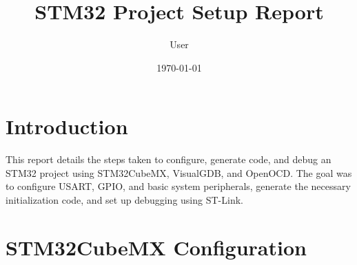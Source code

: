 \documentclass{article}
\title{STM32 Project Setup Report}
\author{User}
\date{\today}
\begin{document}
\maketitle

\section{Introduction}
This report details the steps taken to configure, generate code, and debug an STM32 project using STM32CubeMX, VisualGDB, and OpenOCD. The goal was to configure USART, GPIO, and basic system peripherals, generate the necessary initialization code, and set up debugging using ST-Link.

\section{STM32CubeMX Configuration}
\end{document}
